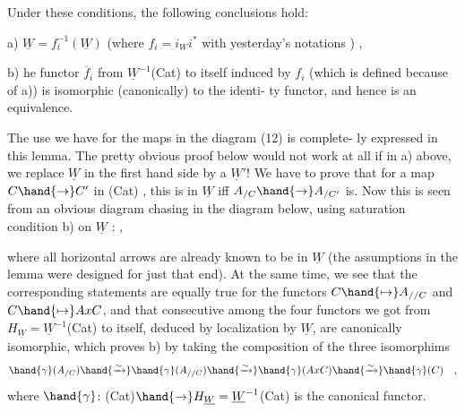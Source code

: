 
Under these conditions,  the following conclusions hold:

a) $\underline{W} = f_{i}^{-1}(\underline{W})$ \quad (where $f_{i} = i_{W}i^{*}$ with yesterday's notations ) ,

b) he functor $\overline{f}_{i}$ from $\underline{W}^{-1}$(Cat) to itself induced by $f_{i}$ (which is
defined because of a)) is isomorphic (canonically) to the identi-%
ty functor, and hence is an equivalence.

The use we have for the   maps in the diagram (12) is complete-%
ly expressed in this lemma. The pretty obvious proof below would not
work at all if in a) above, we replace $\underline{W}$ in the first hand side by a $\underline{W}'$!
We have to prove that for a map $C \hand{\to} C'$ in (Cat) , this is in $\underline{W}$ iff
$A_{/C} \hand{\to} A_{/C'}$ is. Now this is seen from an obvious diagram chasing in the
diagram below, using saturation condition b) on $\underline{W}$ :
 ,

where all horizontal arrows are already known to be in $\underline{W}$ (the assumptions
in the lemma were designed for just that end). At the same time, we see
that the corresponding statements are equally true for the functors
$C \hand{\mapsto} A_{//C}$ and $C \hand{\mapsto} AxC$, and that  consecutive among the four functors
we got from $H_{\underline{W}} = \underline{W}^{-1}$(Cat) to itself, deduced by localization by $\underline{W}$,
are canonically isomorphic, which proves b) by taking the composition
of the three isomorphims
\[ \hand{\gamma}(A_{/C}) \hand{\xrightarrow{\sim}} \hand{\gamma}(A_{//C}) \hand{\xrightarrow{\sim}} \hand{\gamma}(AxC) \hand{\xrightarrow{\sim}} \hand{\gamma}(C) \quad , \]
where $\hand{\gamma}$: (Cat)$\hand{\to} H_{\underline{W}} = \underline{W}^{-1}$(Cat) is the canonical functor.

